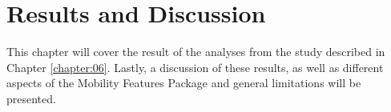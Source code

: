 \chapter{Results and Discussion}
\label{chapter:07}
This chapter will cover the result of the analyses from the study described in Chapter \ref{chapter:06}. Lastly, a discussion of these results, as well as different aspects of the Mobility Features Package and general limitations will be presented.





